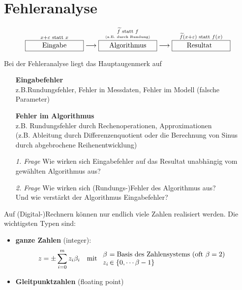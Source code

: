 % 
% 
% 
% 


\chapter{Fehleranalyse} \label{3}
\begin{align*}
  \overset{
  x+\varepsilon \text{ statt } x}%
  {\framebox[3cm]{Eingabe}
  } 
  \longrightarrow 
  \overset{
  \underset{\text{\tiny (z.B. durch Rundung)}}{\widetilde{f} \text{ statt } f}}%
  {\framebox[3cm]{Algorithmus}
  } 
  \longrightarrow
  \overset{
  \widetilde{f}(x+\varepsilon) \text{ statt } f(x)}%
  {\framebox[3cm]{Resultat\phantom{g}}
  }
\end{align*}

Bei der Fehleranalyse liegt das Hauptaugenmerk auf
\begin{itemize}
\item[] \textbf{Eingabefehler}\\ z.B.Rundungsfehler, Fehler in Messdaten, Fehler im Modell (falsche Parameter)
\item[] \textbf{Fehler im Algorithmus} \\ z.B. Rundungsfehler durch Rechenoperationen, Approximationen \\
  (z.B. Ableitung durch Differenzenquotient oder die Berechnung von Sinus durch abgebrochene Reihenentwicklung)
  \\
\item[\textit{1. Frage}] Wie wirken sich Eingabefehler auf das Resultat unabhängig vom gewählten Algorithmus aus?
\item[\textit{2. Frage}]Wie wirken sich (Rundungs-)Fehler des Algorithmus aus?\\
  Und wie verstärkt der Algorithmus Eingabefehler?
\end{itemize}


 \label{3.1}  
Auf (Digital-)Rechnern können nur endlich viele Zahlen realisiert werden.
Die wichtigsten Typen sind: 
\begin{itemize}
\item \textbf{ganze Zahlen}  (integer):
  \begin{align*}
    z&=\pm \sum_{i=0}^{m}z_i\beta_i 
    & \text{mit }
      \begin{array}{l@{\,}l}
        \beta &= \text{Basis des Zahlensystems (oft $\beta=2$)} \\
        z_i &\in \{0, \cdots \beta-1\}
      \end{array}
  \end{align*}
\item \textbf{Gleitpunktzahlen} (floating point) 
\end{itemize}


